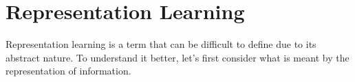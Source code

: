 \documentclass[../../thesis.tex]{subfiles}
\begin{document}














\section{Representation Learning}

Representation learning is a term that can be difficult to define due to its abstract nature. To understand it better, let's first consider what is meant by the representation of information.\newline
\end{document}
